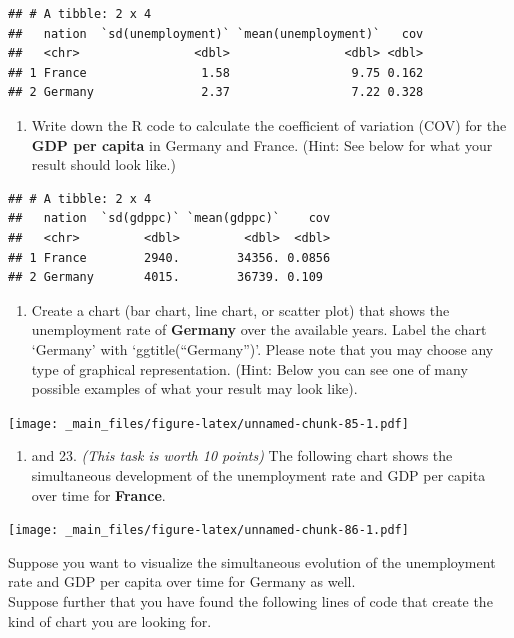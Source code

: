 \documentclass[
  12pt,
  oneside]{book}
\providecommand{\tightlist}{%
  \setlength{\itemsep}{0pt}\setlength{\parskip}{0pt}}
\theoremstyle{definition}
\theoremstyle{definition}
\theoremstyle{definition}
\theoremstyle{definition}
\theoremstyle{remark}
\begin{document}
\begin{verbatim}
## # A tibble: 2 x 4
##   nation  `sd(unemployment)` `mean(unemployment)`   cov
##   <chr>                <dbl>                <dbl> <dbl>
## 1 France                1.58                 9.75 0.162
## 2 Germany               2.37                 7.22 0.328
\end{verbatim}

\begin{enumerate}
\def\labelenumi{(\arabic{enumi})}
\setcounter{enumi}{19}
\tightlist
\item
  Write down the R code to calculate the coefficient of variation (COV) for the \textbf{GDP per capita}
  in Germany and France. (Hint: See below for what your result should look like.)
\end{enumerate}

\begin{verbatim}
## # A tibble: 2 x 4
##   nation  `sd(gdppc)` `mean(gdppc)`    cov
##   <chr>         <dbl>         <dbl>  <dbl>
## 1 France        2940.        34356. 0.0856
## 2 Germany       4015.        36739. 0.109
\end{verbatim}

\begin{enumerate}
\def\labelenumi{(\arabic{enumi})}
\setcounter{enumi}{20}
\tightlist
\item
  Create a chart (bar chart, line chart, or scatter plot) that shows the
  unemployment rate of \textbf{Germany} over the available years. Label the chart
  `Germany' with `ggtitle(``Germany'')'. Please note that you may choose any type of graphical representation.
  (Hint: Below you can see one of many possible examples of what your result may look like).
\end{enumerate}

\texttt{[image: \_main\_files/figure-latex/unnamed-chunk-85-1.pdf]}

\begin{enumerate}
\def\labelenumi{(\arabic{enumi})}
\setcounter{enumi}{21}
\tightlist
\item
  and 23. \emph{(This task is worth 10 points)}
  The following chart shows the simultaneous development of the unemployment rate and GDP per capita over time for \textbf{France}.
\end{enumerate}

\texttt{[image: \_main\_files/figure-latex/unnamed-chunk-86-1.pdf]}

Suppose you want to visualize the simultaneous evolution of the unemployment rate and GDP per capita over time for Germany as well.\\
Suppose further that you have found the following lines of code that create the kind of chart you are looking for.
\end{document}
